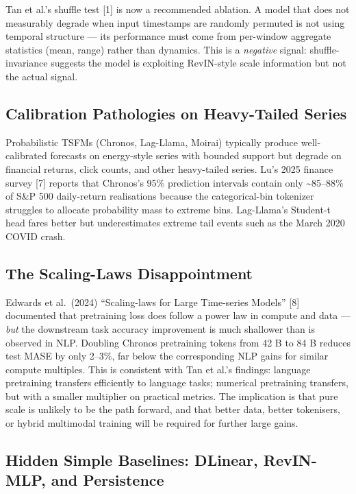 Tan et al.'s shuffle test {[}1{]} is now a recommended ablation. A model that does not measurably degrade when input timestamps are randomly permuted is not using temporal structure --- its performance must come from per-window aggregate statistics (mean, range) rather than dynamics. This is a \emph{negative} signal: shuffle-invariance suggests the model is exploiting RevIN-style scale information but not the actual signal.

\subsection{Calibration Pathologies on Heavy-Tailed Series}\label{calibration-pathologies-on-heavy-tailed-series}

Probabilistic TSFMs (Chronos, Lag-Llama, Moirai) typically produce well-calibrated forecasts on energy-style series with bounded support but degrade on financial returns, click counts, and other heavy-tailed series. Lu's 2025 finance survey {[}7{]} reports that Chronos's 95\% prediction intervals contain only \textasciitilde85--88\% of S\&P 500 daily-return realisations because the categorical-bin tokenizer struggles to allocate probability mass to extreme bins. Lag-Llama's Student-t head fares better but underestimates extreme tail events such as the March 2020 COVID crash.

\subsection{The Scaling-Laws Disappointment}\label{the-scaling-laws-disappointment}

Edwards et al.~(2024) ``Scaling-laws for Large Time-series Models'' {[}8{]} documented that pretraining loss does follow a power law in compute and data --- \emph{but} the downstream task accuracy improvement is much shallower than is observed in NLP. Doubling Chronos pretraining tokens from 42 B to 84 B reduces test MASE by only 2--3\%, far below the corresponding NLP gains for similar compute multiples. This is consistent with Tan et al.'s findings: language pretraining transfers efficiently to language tasks; numerical pretraining transfers, but with a smaller multiplier on practical metrics. The implication is that pure scale is unlikely to be the path forward, and that better data, better tokenisers, or hybrid multimodal training will be required for further large gains.

\subsection{Hidden Simple Baselines: DLinear, RevIN-MLP, and Persistence}\label{hidden-simple-baselines-dlinear-revin-mlp-and-persistence}

